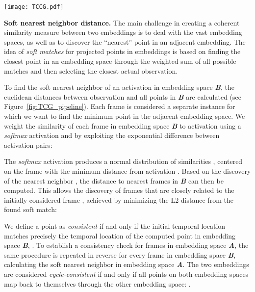 \documentclass[final,5p,times,twocolumn]{elsarticle}
\begin{document}
\begin{figure*}
\centering
\texttt{[image: TCCG.pdf]}
\caption{\textbf{Temporal Gates.} Activations of each frame () in embedding space \textbf{B} are compared to the activations of every frame () in embedding space \textbf{A}. We calculate for each frame-wise activation map () the corresponding soft nearest neighbor () in encoding space \textbf{A}. We then equivalently obtain  in encoding space \textbf{B}. The gate is open when  and  are exactly and sequentially equal to  and .}
\label{fig:TCG_pipeline}
\end{figure*}

\textbf{Soft nearest neighbor distance.} The main challenge in creating a coherent similarity measure between two embeddings is to deal with the vast embedding spaces, as well as to discover the ``nearest'' point in an adjacent embedding. The idea of \textit{soft matches} for projected points in embeddings \citep{goldberger2005neighbourhood} is based on finding the closest point in an embedding space through the weighted sum of all possible matches and then selecting the closest actual observation.

To find the soft nearest neighbor of an activation  in embedding space \textbf{\textit{B}}, the euclidean distances between observation  and all points in \textbf{\textit{B}} are calculated (see Figure~\ref{fig:TCG_pipeline}). Each frame is considered a separate instance for which we want to find the minimum point in the adjacent embedding space. We weight the similarity of each frame in embedding space \textbf{\textit{B}} to activation  using a \textit{softmax} activation and by exploiting the exponential difference between activation pairs:
\vspace{-0.5mm}


The \textit{softmax} activation produces a normal distribution of similarities , centered on the frame with the minimum distance from activation . Based on the discovery of the nearest neighbor , the distance to nearest frames in \textbf{\textit{B}} can then be computed. This allows the discovery of frames that are closely related to the initially considered frame , achieved by minimizing the L2 distance from the found soft match: 
\vspace{-0.5mm}


We define a point as \textit{consistent} if and only if the initial temporal location  matches precisely the temporal location of the computed point in embedding space \textbf{\textit{B}}, . To establish a consistency check for frames in embedding space \textbf{\textit{A}}, the same procedure is repeated in reverse for every frame in embedding space \textbf{\textit{B}}, calculating the soft nearest neighbor in embedding space \textbf{\textit{A}}. The two embeddings are considered \textit{cycle-consistent} if and only if all points on both embedding spaces map back to themselves through the other embedding space: .
\end{document}
